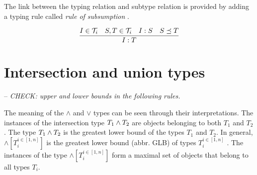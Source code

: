 \documentclass[runningheads]{llncs}
\newcommand{\T}{{\cal T}}
\newcommand{\memo}[1]{}
\newcommand{\notes}[1]{\noindent\begin{small}-- \emph{#1}\hfill\break\end{small}}
\begin{document}
The link between the typing relation and subtype relation is provided
by adding a typing rule called \emph{rule of subsumption}
\cite{Pierce2002}.

\begin{equation}
\label{rul:typing-subsumption}
\dfrac{I\in\T_i\quad\/S,T\in\T_i\quad\/I:S\quad\/S\preceq\/T}
      {I:T}    
\end{equation}


\memo{Properties have dual role: they are instances and types at the same time.}
\memo{Present the features of properties from this point of view.}






\section{Intersection and union types\label{sec:intsc-union}}

\memo{
The meaning of the $\land$ and $\lor$ types can be defined through
their interpretations. The following definition expresses the
denotation of a $\lor$ type with the interpretations of its component
types. Suppose we have a set of types
$\forall\/i\in\/[1..n],\ T_i\in\tau$.

\begin{displaymath}
  \llbracket\lor[T_i^{i\in[1,n]}]\rrbracket_\D = \bigcup_{i\in[1..n]}\llbracket\/T_i\rrbracket_\D
\end{displaymath}

Similarly, the interpretation of a $\land$ type is the intersection of
the interpretations of its component types.

\begin{displaymath}
\llbracket\land[T_i^{i\in[1,n]}]\rrbracket_\D = \bigcap_{i\in[1..n]}\llbracket\/T_i\rrbracket_\D
\end{displaymath}}

\notes{CHECK: upper and lower bounds in the following rules.}

The meaning of the $\land$ and $\lor$ types can be seen through
their interpretations. The instances of the intersection type
$T_1\land\/T_2$ are objects belonging to both $T_1$ and $T_2$. The
type $T_1\land\/T_2$ is the greatest lower bound of the types $T_1$
and $T_2$. In general, $\land[T_i^{i\in[1,n]}]$ is the greatest lower
bound (abbr. GLB) of types $T_i^{i\in[1,n]}$
\cite{Pierce1991,Pierce1996}. The instances of the type
$\land[T_i^{i\in[1,n]}]$ form a maximal set of objects that belong to
all types $T_i$.
\end{document}

